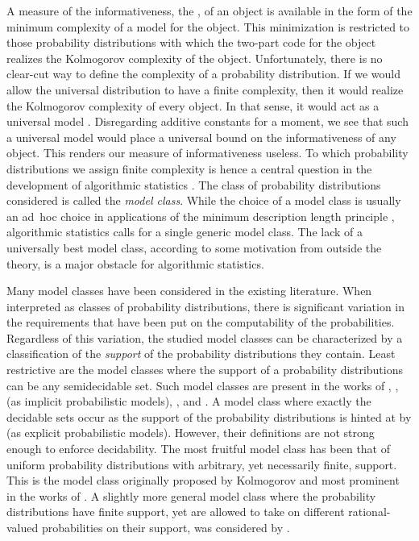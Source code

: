 A measure of the informativeness, the , of an object is available in the form of the minimum complexity of a model for the object.
This minimization is restricted to those probability distributions with which the two-part code for the object realizes the Kolmogorov complexity of the object.
Unfortunately, there is no clear-cut way to define the complexity of a probability distribution.
If we would allow the universal distribution \parencite{li2008introduction} to have a finite complexity, then it would realize the Kolmogorov complexity of every object.
In that sense, it would act as a universal model \parencite{vitanyi2006meaningful,bloem2015two}.
Disregarding additive constants for a moment, we see that such a universal model would place a universal bound on the informativeness of any object.
This renders our measure of informativeness useless.
To which probability distributions we assign finite complexity is hence a central question in the development of algorithmic statistics \parencite{vereshchagin2017algorithmic}.
The class of probability distributions considered is called the \emph{model class}.
While the choice of a model class is usually an ad~hoc choice in applications of the minimum description length principle \parencite{vitanyi2000minimum,grunwald2007minimum}, algorithmic statistics calls for a single generic model class.
The lack of a universally best model class, according to some motivation from outside the theory, is a major obstacle for algorithmic statistics.

Many model classes have been considered in the existing literature.
When interpreted as classes of probability distributions, there is significant variation in the requirements that have been put on the computability of the probabilities.
Regardless of this variation, the studied model classes can be characterized by a classification of the \emph{support} of the probability distributions they contain.
Least restrictive are the model classes where the support of a probability distributions can be any semidecidable set.
Such model classes are present in the works of \textcite{rissanen1983universal}, \textcite{koppel1988structure}, \textcite{gacs2001algorithmic} (as implicit probabilistic models), \textcite{vitanyi2006meaningful}, and \textcite{antunes2009sophistication}.
A model class where exactly the decidable sets occur as the support of the probability distributions is hinted at by \textcite{gacs2001algorithmic} (as explicit probabilistic models).
However, their definitions are not strong enough to enforce decidability.
The most fruitful model class has been that of uniform probability distributions with arbitrary, yet necessarily finite, support.
This is the model class originally proposed by Kolmogorov and most prominent in the works of \textcite{gacs2001algorithmic,vereshchagin2004kolmogorov}.
A slightly more general model class where the probability distributions have finite support, yet are allowed to take on different rational-valued probabilities on their support, was considered by \textcite{vereshchagin2017algorithmic}.

